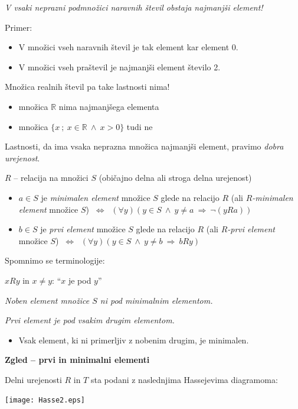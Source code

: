 \documentclass[11pt,paper=b5,footinclude,headinclude]{scrbook} %
\def\inn {{~\wedge~}}
\def\sledi {{~\Rightarrow~}}
\def\cee {{~\Leftrightarrow~}}
\begin{document}
{\em V vsaki neprazni podmnožici naravnih števil obstaja najmanjši element!}

Primer:
\begin{itemize}
  \item V množici vseh naravnih števil je tak element kar element 0.
  \item V množici vseh praštevil je najmanjši element število 2.
\end{itemize}
Množica realnih števil pa take lastnosti nima!
\begin{itemize}
  \item množica $\mathbb{R}$ nima najmanjšega elementa
  \item množica $\{x~;~x\in \mathbb{R} \inn x> 0\}$ tudi ne
\end{itemize}

\bigskip
Lastnosti, da ima vsaka neprazna množica najmanjši element, pravimo {\em dobra urejenost}.

\bigskip
$R$ -- relacija na množici $S$ (običajno delna ali stroga delna urejenost)
\begin{itemize}
  \item $a\in S$ je {\em minimalen element} množice $S$ glede na relacijo $R$ (ali {\em $R$-minimalen element} množice $S$) $\cee$ $(\forall y)(y\in S\inn y\neq a\sledi \neg (yRa))$
  \item $b\in S$ je {\em prvi element} množice $S$ glede na relacijo $R$ (ali {\em $R$-prvi element} množice $S$) $\cee$ $(\forall y)(y\in S\inn y\neq b\sledi bRy)$
\end{itemize}

\bigskip
Spomnimo se terminologije:

$xRy$ in $x\neq y$: ``$x$ je pod $y$''

\medskip
\emph{Noben element množice $S$ ni pod minimalnim elementom.}

\emph{Prvi element je pod vsakim drugim elementom.}

\begin{itemize}
  \item Vsak element, ki ni primerljiv z nobenim drugim, je minimalen.
\end{itemize}

\bigskip
\textbf{Zgled -- prvi in minimalni elementi}

Delni urejenosti $R$ in $T$ sta podani z naslednjima Hassejevima diagramoma:

\begin{center}
\texttt{[image: Hasse2.eps]}
\end{center}
\end{document}
